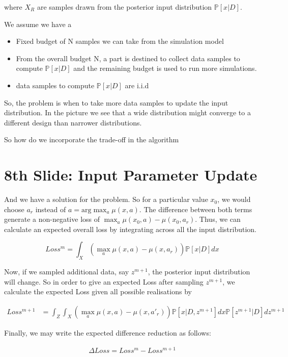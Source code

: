 \documentclass[10pt]{article}
\begin{document}
 where $X_{R}$ are samples drawn from the posterior input distribution $\mathbb{P}[x|D]$.
 
We assume we have a
\begin{itemize}
	\item Fixed budget of N samples we can take from the simulation model
	\item From the overall budget N, a part is destined to collect data samples to compute $\mathbb{P}[x|D]$ and the remaining budget is used to run more simulations.
	\item data samples to compute $\mathbb{P}[x|D]$ are i.i.d
\end{itemize}

So, the problem is when to take more data samples to update the input distribution. In the picture we see that a wide distribution might converge to a different design than narrower distributions.

So how do we incorporate the trade-off in the algorithm

\section{8th Slide: Input Parameter Update}

And we have a solution for the problem. So for a particular value $x_{0}$, we would choose $a_{r}$ instead of $a = \textrm{arg}\max_{a}\mu(x,a)$. The difference between both terms generate a non-negative loss of $\max_{a}\mu(x_{0},a) - \mu(x_{0},a_{r})$. Thus, we can calculate an expected overall loss by integrating across all the input distribution.

$$Loss^{m} = \int_{X}(\max_{a}\mu(x,a) - \mu(x,a_{r}))\mathbb{P}[x|D]dx$$

Now, if we sampled additional data, say $z^{m+1}$, the posterior input distribution will change. So in order to give an expected Loss after sampling $z^{m+1}$, we calculate the expected Loss given all possible realisations by


\begin{align}
Loss^{m+1} &= \int_{Z}\int_{X}(\max_{a}\mu(x,a) - \mu(x,a'_{r}))\mathbb{P}[x|D,z^{m+1}]dx \mathbb{P}[z^{m+1}|D]dz^{m+1}
\end{align}

Finally, we may write the expected difference reduction as follows:

\begin{align}
\Delta Loss = Loss^{m} - Loss^{m+1}
\end{align}
\end{document}
